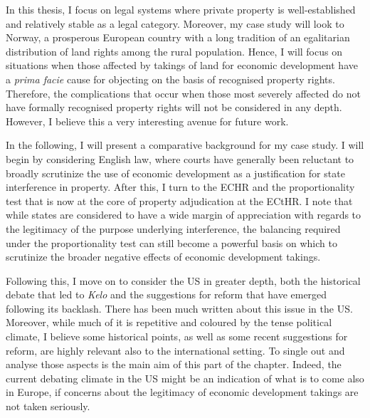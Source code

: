 
In this thesis, I focus on legal systems where private property is well-established and relatively stable as a legal category. Moreover, my case study will look to Norway, a prosperous European country with a long tradition of an egalitarian distribution of land rights among the rural population. Hence, I will focus on situations when those affected by takings of land for economic development have a {\it prima facie} cause for objecting on the basis of recognised property rights. Therefore, the complications that occur when those most severely affected do not have formally recognised property rights will not be considered in any depth. However, I believe this a very interesting avenue for future work.

In the following, I will present a comparative background for my case study. I will begin by considering English law, where courts have generally been reluctant to broadly scrutinize the use of economic development as a justification for state interference in property. After this, I turn to the ECHR and the proportionality test that is now at the core of property adjudication at the ECtHR. I note that while states are considered to have a wide margin of appreciation with regards to the legitimacy of the purpose underlying interference, the balancing required under the proportionality test can still become a powerful basis on which to scrutinize the broader negative effects of economic development takings.

Following this, I move on to consider the US in greater depth, both the historical debate that led to {\it Kelo} and the suggestions for reform that have emerged following its backlash. There has been much written about this issue in the US. Moreover, while much of it is repetitive and coloured by the tense political climate, I believe some historical points, as well as some recent suggestions for reform, are highly relevant also to the international setting. To single out and analyse those aspects is the main aim of this part of the chapter. Indeed, the current debating climate in the US might be an indication of what is to come also in Europe, if concerns about the legitimacy of economic development takings are not taken seriously.

